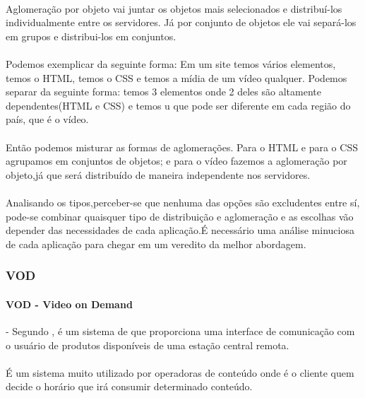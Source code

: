 \paragraph{} Aglomera\c{c}\~ao por objeto vai juntar os objetos mais selecionados e distribu\'i-los individualmente entre os servidores. J\'a por conjunto de objetos ele vai separ\'a-los em grupos e distribui-los em conjuntos. 
\paragraph{} Podemos exemplicar da seguinte forma: Em um site temos v\'arios elementos, temos o HTML, temos o CSS e temos a m\'idia de um v\'ideo qualquer. Podemos separar da seguinte forma: temos 3 elementos onde 2 deles s\~ao altamente dependentes(HTML e CSS) e temos u que pode ser diferente em cada regi\~ao do pa\'is, que \'e o v\'ideo. 
\paragraph{} Ent\~ao podemos misturar as formas de aglomera\c{c}\~oes. Para o HTML e para o CSS agrupamos em conjuntos de objetos; e para o v\'ideo fazemos a aglomera\c{c}\~ao por objeto,j\'a que ser\'a distribu\'ido de maneira independente nos servidores.

\paragraph{} Analisando os tipos,perceber-se que nenhuma das op\c{c}\~oes s\~ao excludentes entre s\'i, pode-se combinar quaisquer tipo de distribui\c{c}\~ao e aglomera\c{c}\~ao e as escolhas v\~ao depender das necessidades de cada aplica\c{c}\~ao.\'E necess\'ario uma an\'alise minuciosa de cada aplica\c{c}\~ao para chegar em um veredito da melhor abordagem.
\subsubsection{VOD}
\label{subsec:vod}
\paragraph{VOD - Video on Demand} - Segundo \cite{garfinkle1996video}, \'e um sistema de que proporciona uma interface de comunica\c{c}\~ao com o usu\'ario de produtos dispon\'iveis de uma esta\c{c}\~ao central remota.
\paragraph{} \'E um sistema muito utilizado por operadoras de conte\'udo onde \'e o cliente quem decide o hor\'ario que ir\'a consumir determinado conte\'udo.
